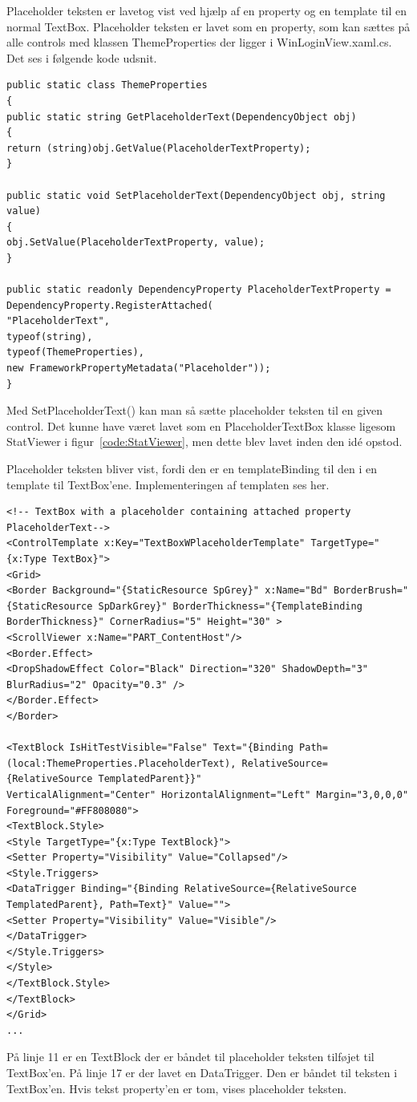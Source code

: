 Placeholder teksten er lavetog vist ved hjælp af en property og en template til en normal TextBox.
Placeholder teksten er lavet som en property, som kan sættes på alle controls med klassen ThemeProperties der ligger i WinLoginView.xaml.cs. Det ses i følgende kode udsnit.
\begin{lstlisting}[caption=ThemeProperties, label=code:asd3]
public static class ThemeProperties
{
public static string GetPlaceholderText(DependencyObject obj)
{
return (string)obj.GetValue(PlaceholderTextProperty);
}

public static void SetPlaceholderText(DependencyObject obj, string value)
{
obj.SetValue(PlaceholderTextProperty, value);
}

public static readonly DependencyProperty PlaceholderTextProperty =
DependencyProperty.RegisterAttached(
"PlaceholderText",
typeof(string),
typeof(ThemeProperties),
new FrameworkPropertyMetadata("Placeholder"));
}
\end{lstlisting} 
Med SetPlaceholderText() kan man så sætte placeholder teksten til en given control.
Det kunne have været lavet som en PlaceholderTextBox klasse ligesom StatViewer i figur~\ref{code:StatViewer}, men dette blev lavet inden den idé opstod.

Placeholder teksten bliver vist, fordi den er en templateBinding til den i en template til TextBox'ene. Implementeringen af templaten ses her.
\begin{lstlisting}[caption=TextBoxWPlaceholderTemplate, label=TextBoxWPlaceholderTemplate]
<!-- TextBox with a placeholder containing attached property PlaceholderText-->
<ControlTemplate x:Key="TextBoxWPlaceholderTemplate" TargetType="{x:Type TextBox}">
<Grid>
<Border Background="{StaticResource SpGrey}" x:Name="Bd" BorderBrush="{StaticResource SpDarkGrey}" BorderThickness="{TemplateBinding BorderThickness}" CornerRadius="5" Height="30" >
<ScrollViewer x:Name="PART_ContentHost"/>
<Border.Effect>
<DropShadowEffect Color="Black" Direction="320" ShadowDepth="3" BlurRadius="2" Opacity="0.3" />
</Border.Effect>
</Border>

<TextBlock IsHitTestVisible="False" Text="{Binding Path=(local:ThemeProperties.PlaceholderText), RelativeSource={RelativeSource TemplatedParent}}" 
VerticalAlignment="Center" HorizontalAlignment="Left" Margin="3,0,0,0" Foreground="#FF808080">
<TextBlock.Style>
<Style TargetType="{x:Type TextBlock}">
<Setter Property="Visibility" Value="Collapsed"/>
<Style.Triggers>
<DataTrigger Binding="{Binding RelativeSource={RelativeSource TemplatedParent}, Path=Text}" Value="">
<Setter Property="Visibility" Value="Visible"/>
</DataTrigger>
</Style.Triggers>
</Style>
</TextBlock.Style>
</TextBlock>
</Grid>
...
\end{lstlisting}
På linje 11 er en TextBlock der er båndet til placeholder teksten tilføjet til TextBox'en. 
På linje 17 er der lavet en DataTrigger. Den er båndet til teksten i TextBox'en. Hvis tekst property'en er tom, vises placeholder teksten.
